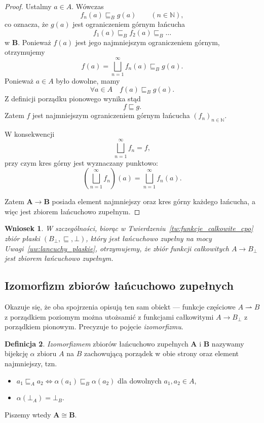 \documentclass[11pt,a4paper]{article}
\theoremstyle{definition}
\newtheorem{definicja}{Definicja}[section]
\theoremstyle{plain}
\newtheorem{wniosek}[definicja]{Wniosek}
\newcommand{\bt}{\bot}                            %
\begin{document}
\begin{proof}
	Ustalmy $a\in A$. Wówczas
	\[
	f_n(a)\sqsubseteq_B g(a)
	\qquad(n\in\mathbb{N}),
	\]
	co oznacza, że $g(a)$ jest ograniczeniem górnym łańcucha
	\[
	f_1(a)\sqsubseteq_B f_2(a)\sqsubseteq_B\ldots
	\]
	w $\boldsymbol{B}$. Ponieważ $f(a)$ jest jego najmniejszym
	ograniczeniem górnym, otrzymujemy
	\[
	f(a)
	=
	\bigsqcup_{n=1}^{\infty}f_n(a)
	\sqsubseteq_B g(a).
	\]
	Ponieważ $a\in A$ było dowolne, mamy
	\[
	\forall a\in A\quad f(a)\sqsubseteq_B g(a).
	\]
	Z definicji porządku pionowego wynika stąd
	\[
	f\sqsubseteq g.
	\]
	Zatem $f$ jest najmniejszym ograniczeniem górnym łańcucha
	$(f_n)_{n\in\mathbb{N}}$.
	
	W konsekwencji
	\[
	\bigsqcup_{n=1}^{\infty}f_n=f,
	\]
	przy czym kres górny jest wyznaczany punktowo:
	\[
	\left(\bigsqcup_{n=1}^{\infty}f_n\right)(a)
	=
	\bigsqcup_{n=1}^{\infty}f_n(a).
	\]
	
	Zatem $\boldsymbol{A\to B}$ posiada element najmniejszy oraz kres
	górny każdego łańcucha, a więc jest zbiorem łańcuchowo zupełnym.
\end{proof}

\begin{wniosek}
	W szczególności, biorąc w Twierdzeniu~\ref{tw:funkcje_calkowite_cpo} zbiór płaski $(B_\bt, \sqsubseteq, \bt)$, który jest łańcuchowo zupełny na mocy Uwagi~\ref{uw:lancuchy_plaskie}, otrzymujemy, że zbiór funkcji całkowitych $A\to B_\bt$ jest zbiorem
łańcuchowo zupełnym.
\end{wniosek}

\subsection{Izomorfizm zbiorów łańcuchowo zupełnych}

Okazuje się, że oba spojrzenia opisują ten sam obiekt --- funkcje częściowe
$A\rightharpoonup B$ z porządkiem poziomym można utożsamić z funkcjami całkowitymi
$A\to B_\bt$ z porządkiem pionowym. Precyzuje to pojęcie \emph{izomorfizmu}. 

\begin{definicja}
	\emph{Izomorfizmem} zbiorów łańcuchowo zupełnych $\boldsymbol{A}$ i
	$\boldsymbol{B}$ nazywamy bijekcję $\alpha$ zbioru $A$ na $B$
	zachowującą porządek w obie strony oraz element najmniejszy, tzn.
	\begin{itemize}
		\item [(1)] $a_1 \sqsubseteq_A a_2 \iff \alpha(a_1)\sqsubseteq_B\alpha(a_2)$
		dla dowolnych $a_1,a_2\in A$,
		\item [(2)] $\alpha(\bt_A)=\bt_B$.
	\end{itemize}
	Piszemy wtedy $\boldsymbol{A}\cong\boldsymbol{B}$.
\end{definicja}
\end{document}
